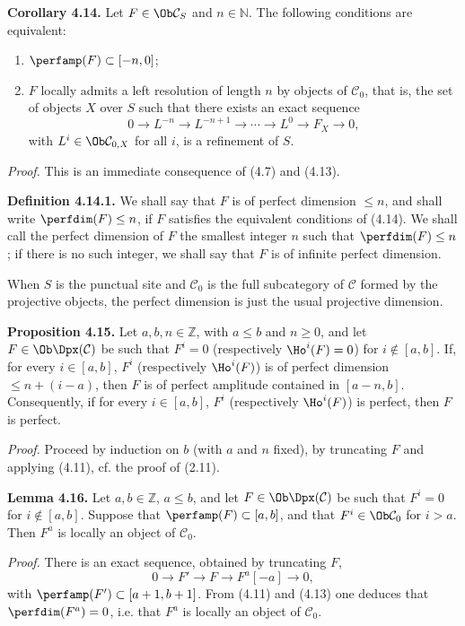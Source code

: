 \documentclass[11pt]{article}
\begin{document}
\textbf{Corollary 4.14.} Let \(F\in\Ob\mathcal C_S\) and \(n\in\mathbb N\). The following conditions are equivalent:
\begin{enumerate}[label=(\roman*)]
\item \(\perfamp(F)\subset[-n,0]\);
\item \(F\) locally admits a left resolution of length \(n\) by objects of \(\mathcal C_0\), that is, the set of objects \(X\) over \(S\) such that there exists an exact sequence
\[
  0\longrightarrow L^{-n}\longrightarrow L^{-n+1}\longrightarrow \cdots
  \longrightarrow L^0\longrightarrow F_X\longrightarrow 0,
\]
with \(L^i\in\Ob\mathcal C_{0,X}\) for all \(i\), is a refinement of \(S\).
\end{enumerate}

\emph{Proof.} This is an immediate consequence of (4.7) and (4.13).

\textbf{Definition 4.14.1.} We shall say that \(F\) is of perfect dimension \(\leq n\), and shall write \(\perfdim(F)\leq n\), if \(F\) satisfies the equivalent conditions of (4.14). We shall call the perfect dimension of \(F\) the smallest integer \(n\) such that \(\perfdim(F)\leq n\); if there is no such integer, we shall say that \(F\) is of infinite perfect dimension.

When \(S\) is the punctual site and \(\mathcal C_0\) is the full subcategory of \(\mathcal C\) formed by the projective objects, the perfect dimension is just the usual projective dimension.

\textbf{Proposition 4.15.} Let \(a,b,n\in\mathbb Z\), with \(a\leq b\) and \(n\geq0\), and let \(F\in\Ob\Dpx(\mathcal C)\) be such that \(F^i=0\) (respectively \(\Ho^i(F)=0\)) for \(i\notin[a,b]\). If, for every \(i\in[a,b]\), \(F^i\) (respectively \(\Ho^i(F)\)) is of perfect dimension \(\leq n+(i-a)\), then \(F\) is of perfect amplitude contained in \([a-n,b]\). Consequently, if for every \(i\in[a,b]\), \(F^i\) (respectively \(\Ho^i(F)\)) is perfect, then \(F\) is perfect.

\emph{Proof.} Proceed by induction on \(b\) (with \(a\) and \(n\) fixed), by truncating \(F\) and applying (4.11), cf. the proof of (2.11).

\textbf{Lemma 4.16.} Let \(a,b\in\mathbb Z\), \(a\leq b\), and let \(F\in\Ob\Dpx(\mathcal C)\) be such that \(F^i=0\) for \(i\notin[a,b]\). Suppose that \(\perfamp(F)\subset[a,b]\), and that \(F^i\in\Ob\mathcal C_0\) for \(i>a\). Then \(F^a\) is locally an object of \(\mathcal C_0\).

\emph{Proof.} There is an exact sequence, obtained by truncating \(F\),
\[
  0\longrightarrow F'\longrightarrow F\longrightarrow F^a[-a]\longrightarrow 0,
\]
with \(\perfamp(F')\subset[a+1,b+1]\). From (4.11) and (4.13) one deduces that \(\perfdim(F^a)=0\), i.e. that \(F^a\) is locally an object of \(\mathcal C_0\).
\end{document}
